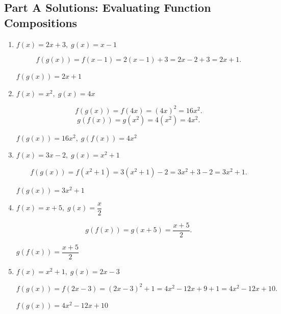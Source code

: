 \documentclass[14pt]{extarticle}
\begin{document}
\subsection*{Part A Solutions: Evaluating Function Compositions}
\begin{enumerate}
  \item \(f(x) = 2x + 3,\; g(x) = x - 1\)

  \[
  f(g(x)) = f(x - 1) = 2(x - 1) + 3 = 2x - 2 + 3 = 2x + 1.
  \]

  \(\boxed{f(g(x)) = 2x + 1}\)

  \item \(f(x) = x^2,\; g(x) = 4x\)

  \[
  f(g(x)) = f(4x) = (4x)^2 = 16x^2.
  \]
  \[
  g(f(x)) = g(x^2) = 4(x^2) = 4x^2.
  \]

  \(\boxed{f(g(x)) = 16x^2,\; g(f(x)) = 4x^2}\)

  \item \(f(x) = 3x - 2,\; g(x) = x^2 + 1\)

  \[
  f(g(x)) = f(x^2 + 1) = 3(x^2 + 1) - 2 = 3x^2 + 3 - 2 = 3x^2 + 1.
  \]

  \(\boxed{f(g(x)) = 3x^2 + 1}\)

  \item \(f(x) = x + 5,\; g(x) = \dfrac{x}{2}\)

  \[
  g(f(x)) = g(x + 5) = \dfrac{x + 5}{2}.
  \]

  \(\boxed{g(f(x)) = \dfrac{x + 5}{2}}\)

  \item \(f(x) = x^2 + 1,\; g(x) = 2x - 3\)

  \[
  f(g(x)) = f(2x - 3) = (2x - 3)^2 + 1 = 4x^2 - 12x + 9 + 1 = 4x^2 - 12x + 10.
  \]

  \(\boxed{f(g(x)) = 4x^2 - 12x + 10}\)
\end{enumerate}
\end{document}
